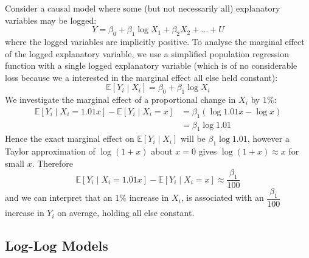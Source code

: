 \documentclass[11pt]{report} %
\begin{document}
Consider a causal model where some (but not necessarily all) explanatory variables may be logged:
\begin{equation}
Y = \beta_{0} + \beta_{1}\log X_{1} + \beta_{2}X_{2} + \dots + U
\end{equation}
where the logged variables are implicitly positive. To analyse the marginal effect of the logged explanatory variable, we use a simplified population regression function with a single logged explanatory variable (which is of no considerable loss because we a interested in the marginal effect all else held constant):
\begin{equation}
\mathbb{E}\left[Y_{i}\middle|X_{i}\right] = \beta_{0} + \beta_{1}\log X_{i}
\end{equation}
We investigate the marginal effect of a proportional change in $X_{i}$ by $1\%$:
\begin{align}
\mathbb{E}\left[Y_{i}\middle|X_{i} = 1.01x \right] - \mathbb{E}\left[Y_{i}\middle|X_{i} =  x \right] &= \beta_{1}\left(\log 1.01x - \log x\right) \\
&= \beta_{1}\log 1.01
\end{align}
Hence the exact marginal effect on $\mathbb{E}\left[Y_{i}\middle|X_{i}\right]$ will be $\beta_{1}\log 1.01$, however a Taylor approximation of $\log\left(1 + x\right)$ about $x = 0$ gives $\log\left(1 + x\right) \approx x$ for small $x$. Therefore
\begin{equation}
\mathbb{E}\left[Y_{i}\middle|X_{i} = 1.01x \right] - \mathbb{E}\left[Y_{i}\middle|X_{i} =  x \right] \approx \dfrac{\beta_{1}}{100}
\end{equation}
and we can interpret that an $1\%$ increase in $X_{i}$, is associated with an $\dfrac{\beta_{1}}{100}$ increase in $Y_{i}$ on average, holding all else constant.

\subsection{Log-Log Models}
\end{document}

